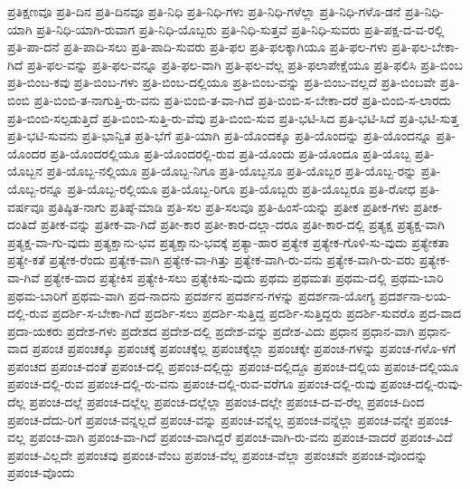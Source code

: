{ಪ್ರತಿಕ್ಷಣವೂ
ಪ್ರತಿ-ದಿನ
ಪ್ರತಿ-ದಿನವೂ
ಪ್ರತಿ-ನಿಧಿ
ಪ್ರತಿ-ನಿಧಿ-ಗಳು
ಪ್ರತಿ-ನಿಧಿ-ಗಳೆಲ್ಲಾ
ಪ್ರತಿ-ನಿಧಿ-ಗಳೊ-ಡನೆ
ಪ್ರತಿ-ನಿಧಿ-ಯಾಗಿ
ಪ್ರತಿ-ನಿಧಿ-ಯಾಗಿ-ರುವಾಗ
ಪ್ರತಿ-ನಿಧಿ-ಯೊಬ್ಬರು
ಪ್ರತಿ-ನಿಧಿ-ಸುತ್ತವೆ
ಪ್ರತಿ-ನಿಧಿ-ಸುವರು
ಪ್ರತಿ-ಪಕ್ಷ-ದ-ವ-ರಲ್ಲಿ
ಪ್ರತಿ-ಪಾ-ದನೆ
ಪ್ರತಿ-ಪಾದಿ-ಸಲು
ಪ್ರತಿ-ಪಾದಿ-ಸುವರು
ಪ್ರತಿ-ಫಲ
ಪ್ರತಿ-ಫಲಕ್ಕಾಗಿಯೂ
ಪ್ರತಿ-ಫಲ-ಗಳು
ಪ್ರತಿ-ಫಲ-ಬೇಕಾ-ಗಿದೆ
ಪ್ರತಿ-ಫಲ-ವನ್ನು
ಪ್ರತಿ-ಫಲ-ವನ್ನೂ
ಪ್ರತಿ-ಫಲ-ವಾಗಿ
ಪ್ರತಿ-ಫಲ-ವೆಲ್ಲ
ಪ್ರತಿ-ಫಲಾಪೇಕ್ಷೆಯೂ
ಪ್ರತಿ-ಫಲಿಸಿ
ಪ್ರತಿ-ಬಿಂಬ
ಪ್ರತಿ-ಬಿಂಬ-ಕವು
ಪ್ರತಿ-ಬಿಂಬ-ಗಳು
ಪ್ರತಿ-ಬಿಂಬ-ದಲ್ಲಿಯೂ
ಪ್ರತಿ-ಬಿಂಬ-ವನ್ನು
ಪ್ರತಿ-ಬಿಂಬ-ವಲ್ಲದೆ
ಪ್ರತಿ-ಬಿಂಬವೇ
ಪ್ರತಿ-ಬಿಂಬಿ
ಪ್ರತಿ-ಬಿಂಬಿ-ತ-ನಾಗುತ್ತಿ-ರು-ವನು
ಪ್ರತಿ-ಬಿಂಬಿ-ತ-ವಾ-ಗಿದೆ
ಪ್ರತಿ-ಬಿಂಬಿ-ಸ-ಬೇಕಾ-ದರೆ
ಪ್ರತಿ-ಬಿಂಬಿ-ಸ-ಲಾರದು
ಪ್ರತಿ-ಬಿಂಬಿ-ಸಲ್ಪಡುತ್ತಿದೆ
ಪ್ರತಿ-ಬಿಂಬಿ-ಸುತ್ತಿ-ರು-ವೆವು
ಪ್ರತಿ-ಬಿಂಬಿ-ಸುವ
ಪ್ರತಿ-ಭಟಿ-ಸಿದ
ಪ್ರತಿ-ಭಟಿ-ಸಿದೆ
ಪ್ರತಿ-ಭಟಿ-ಸುತ್ತ
ಪ್ರತಿ-ಭಟಿ-ಸುವನು
ಪ್ರತಿ-ಭಾನ್ವಿತ
ಪ್ರತಿ-ಭೆಗೆ
ಪ್ರತಿ-ಯಾಗಿ
ಪ್ರತಿ-ಯೊಂದಕ್ಕೂ
ಪ್ರತಿ-ಯೊಂದನ್ನು
ಪ್ರತಿ-ಯೊಂದನ್ನೂ
ಪ್ರತಿ-ಯೊಂದರ
ಪ್ರತಿ-ಯೊಂದರಲ್ಲಿಯೂ
ಪ್ರತಿ-ಯೊಂದರಲ್ಲಿ-ರುವ
ಪ್ರತಿ-ಯೊಂದು
ಪ್ರತಿ-ಯೊಂದೂ
ಪ್ರತಿ-ಯೊಬ್ಬ
ಪ್ರತಿ-ಯೊಬ್ಬನ
ಪ್ರತಿ-ಯೊಬ್ಬ-ನಲ್ಲಿಯೂ
ಪ್ರತಿ-ಯೊಬ್ಬ-ನಿಗೂ
ಪ್ರತಿ-ಯೊಬ್ಬನೂ
ಪ್ರತಿ-ಯೊಬ್ಬರ
ಪ್ರತಿ-ಯೊಬ್ಬ-ರನ್ನು
ಪ್ರತಿ-ಯೊಬ್ಬ-ರನ್ನೂ
ಪ್ರತಿ-ಯೊಬ್ಬ-ರಲ್ಲಿಯೂ
ಪ್ರತಿ-ಯೊಬ್ಬ-ರಿಗೂ
ಪ್ರತಿ-ಯೊಬ್ಬರು
ಪ್ರತಿ-ಯೊಬ್ಬರೂ
ಪ್ರತಿ-ರೋಧ
ಪ್ರತಿ-ವರ್ಷವೂ
ಪ್ರತಿಷ್ಠಿತ-ನಾಗು
ಪ್ರತಿಷ್ಠೆ-ಮಾಡಿ
ಪ್ರತಿ-ಸಲ
ಪ್ರತಿ-ಸಲವೂ
ಪ್ರತಿ-ಹಿಂಸೆ-ಯನ್ನು
ಪ್ರತೀಕ
ಪ್ರತೀಕ-ಗಳು
ಪ್ರತೀಕ-ದಂತಿದೆ
ಪ್ರತೀಕ-ವನ್ನು
ಪ್ರತೀಕ-ವಾ-ಗಿದೆ
ಪ್ರತೀ-ಕಾರ
ಪ್ರತೀ-ಕಾರ-ದಲ್ಲಾ-ದರೂ
ಪ್ರತೀ-ಕಾರ-ದಲ್ಲಿ
ಪ್ರತ್ಯಕ್ಷ
ಪ್ರತ್ಯಕ್ಷ-ವಾಗಿ
ಪ್ರತ್ಯಕ್ಷ-ವಾ-ಗು-ವುದು
ಪ್ರತ್ಯಕ್ಷಾನು-ಭವ
ಪ್ರತ್ಯಕ್ಷಾನು-ಭವಕ್ಕೆ
ಪ್ರತ್ಯಾ-ಹಾರ
ಪ್ರತ್ಯೇಕ
ಪ್ರತ್ಯೇಕ-ಗೊಳಿ-ಸು-ವುದು
ಪ್ರತ್ಯೇಕತಾ
ಪ್ರತ್ಯೇ-ಕತೆ
ಪ್ರತ್ಯೇಕ-ರೆಂದು
ಪ್ರತ್ಯೇಕ-ವಾಗಿ
ಪ್ರತ್ಯೇಕ-ವಾ-ಗಿತ್ತು
ಪ್ರತ್ಯೇಕ-ವಾಗಿ-ರು-ವನು
ಪ್ರತ್ಯೇಕ-ವಾಗಿ-ರು-ವರು
ಪ್ರತ್ಯೇಕ-ವಾ-ಗಿವೆ
ಪ್ರತ್ಯೇಕ-ವಾದ
ಪ್ರತ್ಯೇಕಿಸ
ಪ್ರತ್ಯೇಕಿ-ಸಲು
ಪ್ರತ್ಯೇಕಿಸು-ವುದು
ಪ್ರಥಮ
ಪ್ರಥಮತಃ
ಪ್ರಥಮ-ದಲ್ಲಿ
ಪ್ರಥಮ-ಬಾರಿ
ಪ್ರಥಮ-ಬಾರಿಗೆ
ಪ್ರಥಮ-ವಾಗಿ
ಪ್ರದ-ನಾದನು
ಪ್ರದರ್ಶನ
ಪ್ರದರ್ಶನ-ಗಳನ್ನು
ಪ್ರದರ್ಶನಾ-ಯೋಗ್ಯ
ಪ್ರದರ್ಶನಾ-ಲಯ-ದಲ್ಲಿ-ರುವ
ಪ್ರದರ್ಶಿ-ಸ-ಬೇಕಾ-ಗಿದೆ
ಪ್ರದರ್ಶಿ-ಸಲು
ಪ್ರದರ್ಶಿ-ಸುತ್ತಿದ್ದ
ಪ್ರದರ್ಶಿ-ಸುತ್ತಿದ್ದರು
ಪ್ರದರ್ಶಿ-ಸುವರೊ
ಪ್ರದ-ವಾದ
ಪ್ರದಾ-ಯಕರು
ಪ್ರದೇಶ-ಗಳು
ಪ್ರದೇಶದ
ಪ್ರದೇಶ-ದಲ್ಲಿ
ಪ್ರದೇಶ-ವನ್ನು
ಪ್ರದೇಶ-ವಿದು
ಪ್ರಧಾನ
ಪ್ರಧಾನ-ವಾಗಿ
ಪ್ರಧಾನ-ವಾದ
ಪ್ರಪಂಚ
ಪ್ರಪಂಚಕ್ಕೂ
ಪ್ರಪಂಚಕ್ಕೆ
ಪ್ರಪಂಚಕ್ಕೆಲ್ಲ
ಪ್ರಪಂಚಕ್ಕೆಲ್ಲಾ
ಪ್ರಪಂಚಕ್ಕೇ
ಪ್ರಪಂಚ-ಗಳನ್ನು
ಪ್ರಪಂಚ-ಗಳೊ-ಳಗೆ
ಪ್ರಪಂಚದ
ಪ್ರಪಂಚ-ದಂತೆ
ಪ್ರಪಂಚ-ದಲ್ಲಿ
ಪ್ರಪಂಚ-ದಲ್ಲಿದ್ದು
ಪ್ರಪಂಚ-ದಲ್ಲಿದ್ದೂ
ಪ್ರಪಂಚ-ದಲ್ಲಿಯ
ಪ್ರಪಂಚ-ದಲ್ಲಿಯೂ
ಪ್ರಪಂಚ-ದಲ್ಲಿ-ರುವ
ಪ್ರಪಂಚ-ದಲ್ಲಿ-ರು-ವನು
ಪ್ರಪಂಚ-ದಲ್ಲಿ-ರುವ-ವರೆಗೂ
ಪ್ರಪಂಚ-ದಲ್ಲಿ-ರುವು
ಪ್ರಪಂಚ-ದಲ್ಲಿ-ರುವು-ದೆಲ್ಲ
ಪ್ರಪಂಚ-ದಲ್ಲೆ
ಪ್ರಪಂಚ-ದಲ್ಲೆಲ್ಲ
ಪ್ರಪಂಚ-ದಲ್ಲೆಲ್ಲಾ
ಪ್ರಪಂಚ-ದಲ್ಲೇ
ಪ್ರಪಂಚ-ದ-ವ-ರೆಲ್ಲ
ಪ್ರಪಂಚ-ದಿಂದ
ಪ್ರಪಂಚ-ದೆದು-ರಿಗೆ
ಪ್ರಪಂಚ-ವನ್ನಲ್ಲದೆ
ಪ್ರಪಂಚ-ವನ್ನು
ಪ್ರಪಂಚ-ವನ್ನೆಲ್ಲ
ಪ್ರಪಂಚ-ವನ್ನೆಲ್ಲಾ
ಪ್ರಪಂಚ-ವನ್ನೇ
ಪ್ರಪಂಚ-ವಲ್ಲ
ಪ್ರಪಂಚ-ವಾಗಿ
ಪ್ರಪಂಚ-ವಾ-ಗಿದೆ
ಪ್ರಪಂಚ-ವಾಗಿದ್ದರೆ
ಪ್ರಪಂಚ-ವಾಗಿ-ರು-ವನು
ಪ್ರಪಂಚ-ವಾದರೆ
ಪ್ರಪಂಚ-ವಿದೆ
ಪ್ರಪಂಚ-ವಿಲ್ಲದೇ
ಪ್ರಪಂಚವು
ಪ್ರಪಂಚ-ವೆಂಬ
ಪ್ರಪಂಚ-ವೆಲ್ಲ
ಪ್ರಪಂಚ-ವೆಲ್ಲಾ
ಪ್ರಪಂಚವೇ
ಪ್ರಪಂಚ-ವೊಂದನ್ನು
ಪ್ರಪಂಚ-ವೊಂದು
}
